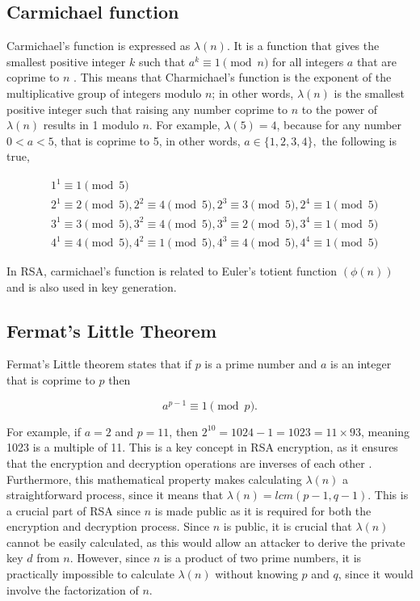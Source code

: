 \subsection{Carmichael function}\label{sec:section2.4} 
Carmichael’s function is expressed as $\lambda(n)$. It is a function that gives the smallest positive integer $k$ such that $a^{k} \equiv 1 \pmod{n}$ for all integers $a$ that are coprime to $n$ \citep{Carmichael1910}. This means that Charmichael’s function is the exponent of the multiplicative group of integers modulo $n$; in other words, $\lambda(n)$ is the smallest positive integer such that raising any number coprime to $n$ to the power of $\lambda(n)$ results in 1 modulo $n$. For example, $\lambda (5) = 4$, because for any number $0 < a < 5$, that is coprime to 5, in other words, $a \in \{ 1,2,3,4 \},$ the following is true,

\[
\begin{aligned}
    &1^{1} \equiv 1 \pmod{5} \\
    &2^{1} \equiv 2 \pmod{5}, 2^{2} \equiv 4 \pmod{5}, 2^{3} \equiv 3 \pmod{5}, 2^{4} \equiv 1 \pmod{5} \\
    &3^{1} \equiv 3 \pmod{5}, 3^{2} \equiv 4 \pmod{5}, 3^{3} \equiv 2 \pmod{5}, 3^{4} \equiv 1 \pmod{5} \\
    &4^{1} \equiv 4 \pmod{5}, 4^{2} \equiv 1 \pmod{5}, 4^{3} \equiv 4 \pmod{5}, 4^{4} \equiv 1 \pmod{5}
\end{aligned}
\]

In RSA, carmichael’s function is related to Euler’s totient function $(\phi(n))$ and is also used in key generation.

\subsection{Fermat's Little Theorem}\label{sec:section2.5}
Fermat’s Little theorem states that if $p$ is a prime number and $a$ is an integer that is coprime to $p$ then

$$a^{p-1}\equiv 1 \pmod{p}.$$

For example, if $a=2$ and $p=11$, then $2^{10} = 1024-1 = 1023 = 11 \times 93$, meaning 1023 is a multiple of 11. This is a key concept in RSA encryption, as it ensures that the encryption and decryption operations are inverses of each other \citep{fermats}. Furthermore, this mathematical property makes calculating $\lambda(n)$ a straightforward process, since it means that $\lambda(n) = lcm(p-1, q-1)$. This is a crucial part of RSA since $n$ is made public as it is required for both the encryption and decryption process. Since $n$ is public, it is crucial that $\lambda(n)$ cannot be easily calculated, as this would allow an attacker to derive the private key $d$ from $n$. However, since $n$ is a product of two prime numbers, it is practically impossible to calculate $\lambda(n)$ without knowing $p$ and $q$, since it would involve the factorization of $n$.

